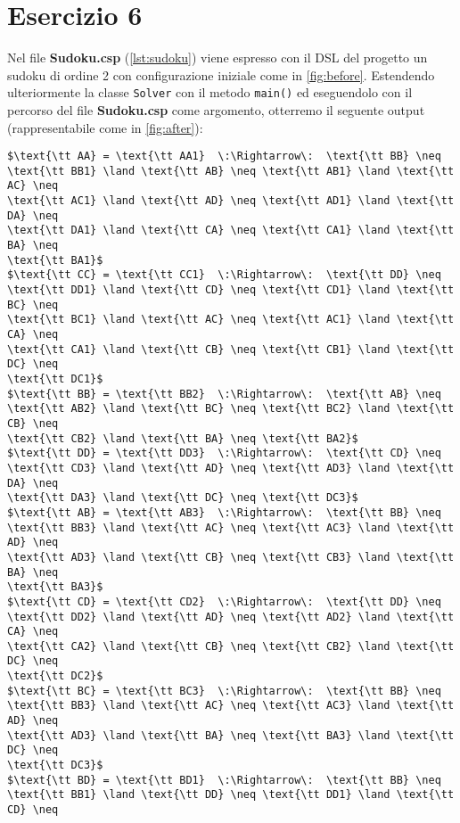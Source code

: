 \section*{Esercizio 6}

Nel file {\bf Sudoku.csp} (\autoref{lst:sudoku}) viene espresso con il DSL del
progetto un sudoku di ordine 2 con configurazione iniziale come in
\autoref{fig:before}. Estendendo ulteriormente la classe {\tt Solver} con il
metodo {\tt main()} ed eseguendolo con il percorso del file {\bf Sudoku.csp}
come argomento, otterremo il seguente output (rappresentabile come in
\autoref{fig:after}):
%
\begin{lstlisting}[mathescape=true, numbers=none, frame=none]
$\text{\tt AA} = \text{\tt AA1}  \:\Rightarrow\:  \text{\tt BB} \neq
\text{\tt BB1} \land \text{\tt AB} \neq \text{\tt AB1} \land \text{\tt AC} \neq
\text{\tt AC1} \land \text{\tt AD} \neq \text{\tt AD1} \land \text{\tt DA} \neq
\text{\tt DA1} \land \text{\tt CA} \neq \text{\tt CA1} \land \text{\tt BA} \neq
\text{\tt BA1}$
$\text{\tt CC} = \text{\tt CC1}  \:\Rightarrow\:  \text{\tt DD} \neq
\text{\tt DD1} \land \text{\tt CD} \neq \text{\tt CD1} \land \text{\tt BC} \neq
\text{\tt BC1} \land \text{\tt AC} \neq \text{\tt AC1} \land \text{\tt CA} \neq
\text{\tt CA1} \land \text{\tt CB} \neq \text{\tt CB1} \land \text{\tt DC} \neq
\text{\tt DC1}$
$\text{\tt BB} = \text{\tt BB2}  \:\Rightarrow\:  \text{\tt AB} \neq
\text{\tt AB2} \land \text{\tt BC} \neq \text{\tt BC2} \land \text{\tt CB} \neq
\text{\tt CB2} \land \text{\tt BA} \neq \text{\tt BA2}$
$\text{\tt DD} = \text{\tt DD3}  \:\Rightarrow\:  \text{\tt CD} \neq
\text{\tt CD3} \land \text{\tt AD} \neq \text{\tt AD3} \land \text{\tt DA} \neq
\text{\tt DA3} \land \text{\tt DC} \neq \text{\tt DC3}$
$\text{\tt AB} = \text{\tt AB3}  \:\Rightarrow\:  \text{\tt BB} \neq
\text{\tt BB3} \land \text{\tt AC} \neq \text{\tt AC3} \land \text{\tt AD} \neq
\text{\tt AD3} \land \text{\tt CB} \neq \text{\tt CB3} \land \text{\tt BA} \neq
\text{\tt BA3}$
$\text{\tt CD} = \text{\tt CD2}  \:\Rightarrow\:  \text{\tt DD} \neq
\text{\tt DD2} \land \text{\tt AD} \neq \text{\tt AD2} \land \text{\tt CA} \neq
\text{\tt CA2} \land \text{\tt CB} \neq \text{\tt CB2} \land \text{\tt DC} \neq
\text{\tt DC2}$
$\text{\tt BC} = \text{\tt BC3}  \:\Rightarrow\:  \text{\tt BB} \neq
\text{\tt BB3} \land \text{\tt AC} \neq \text{\tt AC3} \land \text{\tt AD} \neq
\text{\tt AD3} \land \text{\tt BA} \neq \text{\tt BA3} \land \text{\tt DC} \neq
\text{\tt DC3}$
$\text{\tt BD} = \text{\tt BD1}  \:\Rightarrow\:  \text{\tt BB} \neq
\text{\tt BB1} \land \text{\tt DD} \neq \text{\tt DD1} \land \text{\tt CD} \neq

\end{lstlisting}
